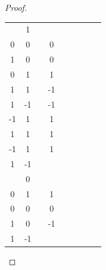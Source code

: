 \begin{proof}
	\begin{tabular}{c|c|c|c|c|c|c|c|c}
		\( \begin{matrix}
			   0 & 1 \\
			   0 & 0
		   \end{matrix}\)
		 &
		\( \begin{matrix}
			   0 & 0 \\
			   1 & 0
		   \end{matrix}\)
		 &
		\( \begin{matrix}
			   0 & 0 \\
			   0 & 1
		   \end{matrix}\)
		 &
		\( \begin{matrix}
			   1 & 1 \\
			   1 & 1
		   \end{matrix}\)
		 &
		\( \begin{matrix}
			   1 & -1 \\
			   1 & -1
		   \end{matrix}\)
		 &
		\( \begin{matrix}
			   1  & -1 \\
			   -1 & 1
		   \end{matrix}\)
		 &
		\( \begin{matrix}
			   -1 & 1 \\
			   1  & 1
		   \end{matrix}\)
		 &
		\( \begin{matrix}
			   1  & 1 \\
			   -1 & 1
		   \end{matrix}\)
		 &
		\( \begin{matrix}
			   1 & 1  \\
			   1 & -1
		   \end{matrix}\) \\
		\hline
		\( \begin{matrix}
			   0 & 0 \\
			   0 & 1
		   \end{matrix}\)
		 &
		\( \begin{matrix}
			   0 & 1 \\
			   0 & 0
		   \end{matrix}\)
		 &
		\( \begin{matrix}
			   0 & 0 \\
			   1 & 0
		   \end{matrix}\)
		 &
		\( \begin{matrix}
			   1 & -1 \\
			   1 & -1
		   \end{matrix}\)

\end{tabular}
\end{proof}
